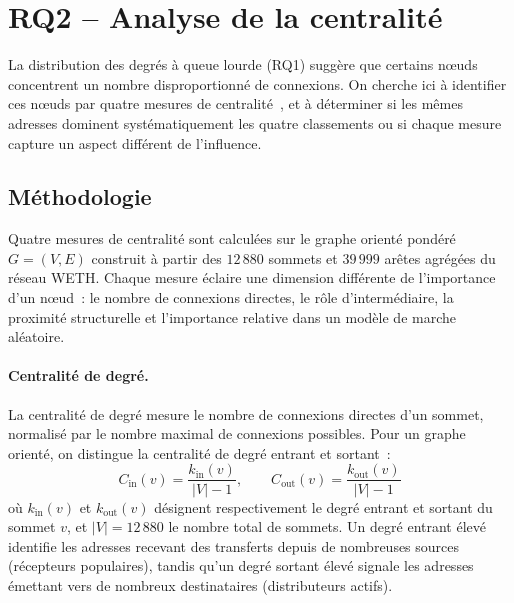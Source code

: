 
\section{RQ2 -- Analyse de la centralit\'e}
\label{sec:rq2}

La distribution des degr\'es \`a queue lourde (RQ1) sugg\`ere que certains n\oe{}uds concentrent un nombre disproportionn\'e de connexions. On cherche ici \`a identifier ces n\oe{}uds par quatre mesures de centralit\'e~\cite{freeman1977centrality}, et \`a d\'eterminer si les m\^emes adresses dominent syst\'ematiquement les quatre classements ou si chaque mesure capture un aspect diff\'erent de l'influence.

\subsection{M\'ethodologie}
\label{sec:rq2_methodo}

Quatre mesures de centralit\'e sont calcul\'ees sur le graphe orient\'e pond\'er\'e $G = (V, E)$ construit \`a partir des $12\,880$ sommets et $39\,999$ ar\^etes agr\'eg\'ees du r\'eseau WETH. Chaque mesure \'eclaire une dimension diff\'erente de l'importance d'un n\oe{}ud~: le nombre de connexions directes, le r\^ole d'interm\'ediaire, la proximit\'e structurelle et l'importance relative dans un mod\`ele de marche al\'eatoire.

\paragraph{Centralit\'e de degr\'e.}
La centralit\'e de degr\'e mesure le nombre de connexions directes d'un sommet, normalis\'e par le nombre maximal de connexions possibles. Pour un graphe orient\'e, on distingue la centralit\'e de degr\'e entrant et sortant~:
\begin{equation}
C_{\text{in}}(v) = \frac{k_{\text{in}}(v)}{|V|-1}, \qquad C_{\text{out}}(v) = \frac{k_{\text{out}}(v)}{|V|-1}
\label{eq:degree_centrality}
\end{equation}
o\`u $k_{\text{in}}(v)$ et $k_{\text{out}}(v)$ d\'esignent respectivement le degr\'e entrant et sortant du sommet $v$, et $|V| = 12\,880$ le nombre total de sommets. Un degr\'e entrant \'elev\'e identifie les adresses recevant des transferts depuis de nombreuses sources (r\'ecepteurs populaires), tandis qu'un degr\'e sortant \'elev\'e signale les adresses \'emettant vers de nombreux destinataires (distributeurs actifs).

